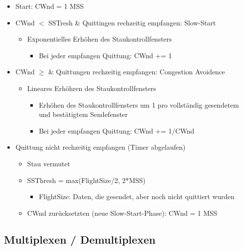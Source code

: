      \begin{itemize}
        \item Start: CWnd = 1 MSS
        \item CWnd $<$ SSTresh \& Quittingen rechzeitig empfangen: Slow-Start
          \begin{itemize}
            \item Exponentielles Erhöhen des Staukontrollfensters
              \begin{itemize}
                \item Bei jeder empfangen Quittung: CWnd += 1
              \end{itemize}
          \end{itemize}
        \item CWnd $\ge$ \& Quittungen rechzeitig empfangen: Congestion Avoidence
          \begin{itemize}
            \item Lineares Erhöhren des Staukontrollfensters
              \begin{itemize}
                \item Erhöhen des Staukontrollfensters um 1 pro vollständig gesendetem und bestätigtem
                  Sendefenster
                \item Bei jeder empfangen Quittung: CWnd += 1/CWnd
              \end{itemize}
          \end{itemize}
        \item Quittung nicht rechzeitig empfangen (Timer abgelaufen)
          \begin{itemize}
            \item Stau vermutet
            \item SSThresh = max(FlightSize/2, 2*MSS)
              \begin{itemize}
                \item FlightSize: Daten, die gesendet, aber noch nicht quittiert wurden
              \end{itemize}
            \item CWnd zurücksetzten (neue Slow-Start-Phase): CWnd = 1 MSS
          \end{itemize}
      \end{itemize}
  \subsection{Multiplexen / Demultiplexen}
